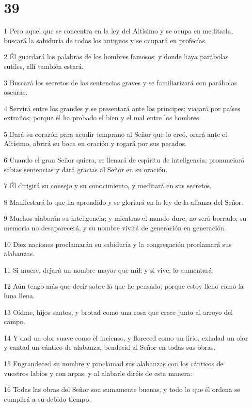 \chapter{39}

\par 1 Pero aquel que se concentra en la ley del Altísimo y se ocupa en meditarla, buscará la sabiduría de todos los antiguos y se ocupará en profecías.
\par 2 Él guardará las palabras de los hombres famosos; y donde haya parábolas sutiles, allí también estará.
\par 3 Buscará los secretos de las sentencias graves y se familiarizará con parábolas oscuras.
\par 4 Servirá entre los grandes y se presentará ante los príncipes; viajará por países extraños; porque él ha probado el bien y el mal entre los hombres.
\par 5 Dará su corazón para acudir temprano al Señor que lo creó, orará ante el Altísimo, abrirá su boca en oración y rogará por sus pecados.
\par 6 Cuando el gran Señor quiera, se llenará de espíritu de inteligencia; pronunciará sabias sentencias y dará gracias al Señor en su oración.
\par 7 Él dirigirá su consejo y su conocimiento, y meditará en sus secretos.
\par 8 Manifestará lo que ha aprendido y se gloriará en la ley de la alianza del Señor.
\par 9 Muchos alabarán su inteligencia; y mientras el mundo dure, no será borrado; su memoria no desaparecerá, y su nombre vivirá de generación en generación.
\par 10 Diez naciones proclamarán su sabiduría y la congregación proclamará sus alabanzas.
\par 11 Si muere, dejará un nombre mayor que mil; y si vive, lo aumentará.
\par 12 Aún tengo más que decir sobre lo que he pensado; porque estoy lleno como la luna llena.
\par 13 Oídme, hijos santos, y brotad como una rosa que crece junto al arroyo del campo.
\par 14 Y dad un olor suave como el incienso, y floreced como un lirio, exhalad un olor y cantad un cántico de alabanza, bendecid al Señor en todas sus obras.
\par 15 Engrandeced su nombre y proclamad sus alabanzas con los cánticos de vuestros labios y con arpas, y al alabarle diréis de esta manera:
\par 16 Todas las obras del Señor son sumamente buenas, y todo lo que él ordena se cumplirá a su debido tiempo.
